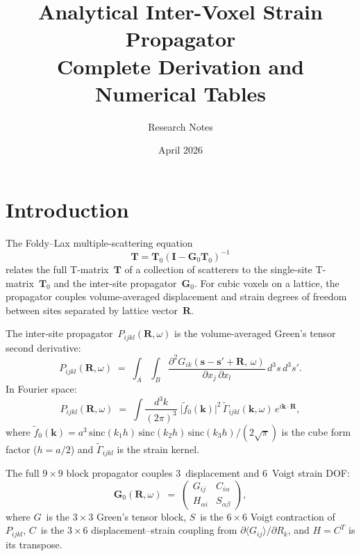 \documentclass[11pt,a4paper]{article}
\title{Analytical Inter-Voxel Strain Propagator\\
\large Complete Derivation and Numerical Tables}
\author{Research Notes}
\date{April 2026}
\newcommand{\bR}{\bm{R}}
\newcommand{\bk}{\bm{k}}
\newcommand{\bs}{\bm{s}}
\theoremstyle{plain}
\theoremstyle{remark}
\begin{document}
\maketitle
\tableofcontents
\vspace{1em}

\section{Introduction}
\label{sec:intro}

The Foldy--Lax multiple-scattering equation
\begin{equation}
  \mathbf{T} = \mathbf{T}_0(\mathbf{I} - \mathbf{G}_0\mathbf{T}_0)^{-1}
  \label{eq:foldy-lax}
\end{equation}
relates the full T-matrix~$\mathbf{T}$ of a collection of scatterers
to the single-site T-matrix~$\mathbf{T}_0$ and the inter-site
propagator~$\mathbf{G}_0$.  For cubic voxels on a lattice, the
propagator couples volume-averaged displacement and strain degrees of
freedom between sites separated by lattice vector~$\bR$.

The inter-site propagator~$P_{ijkl}(\bR,\omega)$ is the
volume-averaged Green's tensor second derivative:
\begin{equation}
  P_{ijkl}(\bR,\omega) \;=\;
  \int_A\!\int_B
  \frac{\partial^2 G_{ik}(\bs-\bs'+\bR,\,\omega)}%
       {\partial x_j\,\partial x_l}\,d^3s\,d^3s'.
  \label{eq:Pijkl-def}
\end{equation}
In Fourier space:
\begin{equation}
  P_{ijkl}(\bR,\omega) \;=\;
  \int\!\frac{d^3k}{(2\pi)^3}\;
  \bigl|\tilde{f}_0(\bk)\bigr|^2\,
  \tilde{\Gamma}_{ijkl}(\bk,\omega)\,
  e^{i\bk\cdot\bR},
  \label{eq:Pijkl-fourier}
\end{equation}
where $\tilde{f}_0(\bk) = a^3\,\mathrm{sinc}(k_1 h)\,
\mathrm{sinc}(k_2 h)\,\mathrm{sinc}(k_3 h)/(2\sqrt{\pi})$
is the cube form factor ($h=a/2$) and
$\tilde{\Gamma}_{ijkl}$ is the strain kernel.

The full $9\times 9$ block propagator couples 3~displacement and
6~Voigt strain DOF:
\begin{equation}
  \mathbf{G}_0(\bR,\omega)
  \;=\;
  \begin{pmatrix}
    G_{ij} & C_{i\alpha} \\
    H_{\alpha i} & S_{\alpha\beta}
  \end{pmatrix},
  \label{eq:9x9-structure}
\end{equation}
where $G$~is the $3\times 3$ Green's tensor block,
$S$~is the $6\times 6$ Voigt contraction of~$P_{ijkl}$,
$C$~is the $3\times 6$ displacement--strain coupling
from $\partial\langle G_{ij}\rangle/\partial R_k$,
and $H = C^T$ is its transpose.
\end{document}
